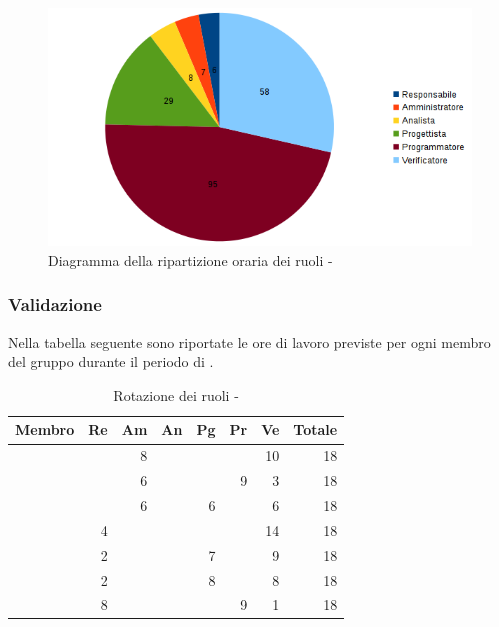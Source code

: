 \documentclass[12pt,a4paper]{article}
\begin{document}
\begin{center}
	\begin{figure}[H]
		\centering
		\includegraphics[width=\textwidth]{../img/diagrammaTortaCodificaTotaleOre.png}
		\caption{Diagramma della ripartizione oraria dei ruoli - \FPDC{}}
	\end{figure}
\end{center}

\newpage
\subsubsection{Validazione}

Nella tabella seguente sono riportate le ore di lavoro previste per ogni membro del gruppo durante il periodo di \FV.

\begin{table}[H]
	\begin{center}
		\begin{tabular}{l r r r r r r r}
			\toprule
			\textbf{Membro}	&	\textbf{Re}	&	\textbf{Am}	& \textbf{An} & \textbf{Pg} & \textbf{Pr} & \textbf{Ve} & \textbf{Totale}\\
			\midrule
			\midrule
			\IB{} & & 8 & & & & 10 & 18 \\
			\midrule
			\AB{} & & 6 & & & 9 & 3 & 18 \\
			\midrule
			\NDC{} & & 6 & & 6 & & 6 & 18 \\
			\midrule
			\TP{} & 4 & & & & &14 & 18 \\
			\midrule
			\WS{} & 2 & & & 7 & & 9 & 18 \\
			\midrule
			\AVE{} & 2 & & & 8 & & 8 & 18 \\
			\midrule
			\AVI{} & 8 & & & & 9 & 1 & 18 \\
			\bottomrule
		\end{tabular}
		\caption{Rotazione dei ruoli - \FVV{}}
	\end{center}
\end{table}
\end{document}
